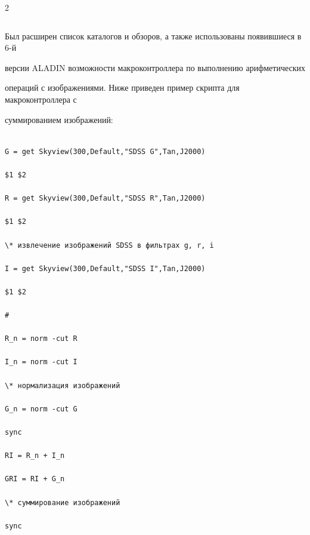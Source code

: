 \begin{multicols}{2}
\begin{table}[b]
\begin{center}
\begin{tabular}{|l|c|c|c|c|}
 \end{tabular}

\end{center}

\end{table}

      

      Был расширен список каталогов и обзоров, а также использованы появившиеся в 6-й 

версии \mbox{ALADIN} возможности макроконтроллера по выполнению арифметических 

операций с изображениями. Ниже приведен пример скрипта для макроконтроллера с 

суммированием изображений:









{\noindent

\small

      \begin{verbatim}

G = get Skyview(300,Default,"SDSS G",Tan,J2000)

$1 $2 

R = get Skyview(300,Default,"SDSS R",Tan,J2000) 

$1 $2 

\* извлечение изображений SDSS в фильтрах g, r, i 

I = get Skyview(300,Default,"SDSS I",Tan,J2000) 

$1 $2 

#

R_n = norm -cut R 

I_n = norm -cut I                                     

\* нормализация изображений

G_n = norm -cut G

sync 

RI = R_n + I_n 

GRI = RI + G_n                                        

\* суммирование изображений 

sync

\end{verbatim}



}




\end{multicols}
